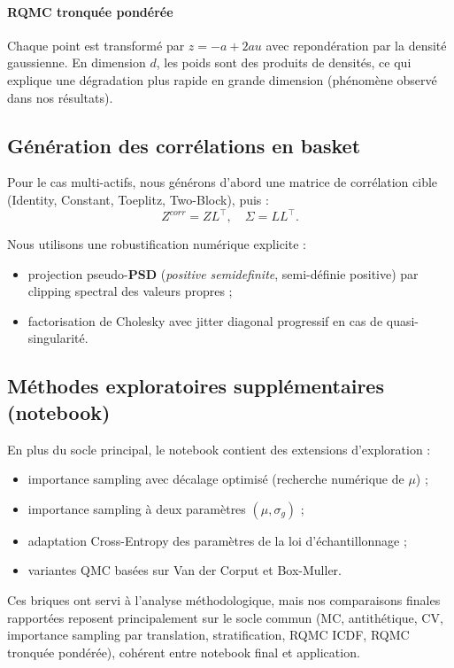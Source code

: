 ﻿\documentclass[11pt,a4paper]{article}
\begin{document}
\paragraph{RQMC tronquée pondérée}
Chaque point est transformé par $z=-a+2au$ avec repondération par la densité gaussienne. En dimension $d$, les poids sont des produits de densités, ce qui explique une dégradation plus rapide en grande dimension (phénomène observé dans nos résultats).

\subsection{Génération des corrélations en basket}

Pour le cas multi-actifs, nous générons d'abord une matrice de corrélation cible (Identity, Constant, Toeplitz, Two-Block), puis :
\begin{equation}
Z^{corr}=ZL^\top, \quad \Sigma=LL^\top.
\end{equation}

Nous utilisons une robustification numérique explicite :
\begin{itemize}
    \item projection pseudo-\textbf{PSD} (\textit{positive semidefinite}, semi-définie positive) par clipping spectral des valeurs propres ;
    \item factorisation de Cholesky avec jitter diagonal progressif en cas de quasi-singularité.
\end{itemize}

\subsection{Méthodes exploratoires supplémentaires (notebook)}

En plus du socle principal, le notebook contient des extensions d'exploration :
\begin{itemize}
    \item importance sampling avec décalage optimisé (recherche numérique de $\mu$) ;
    \item importance sampling à deux paramètres $(\mu,\sigma_g)$ ;
    \item adaptation Cross-Entropy des paramètres de la loi d'échantillonnage ;
    \item variantes QMC basées sur Van der Corput et Box-Muller.
\end{itemize}
Ces briques ont servi à l'analyse méthodologique, mais nos comparaisons finales rapportées reposent principalement sur le socle commun (MC, antithétique, CV, importance sampling par translation, stratification, RQMC ICDF, RQMC tronquée pondérée), cohérent entre notebook final et application.
\end{document}
